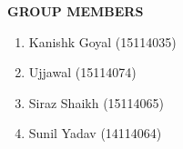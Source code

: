 \documentclass[18 pt]{article}
\begin{document}
\begin{large}
\begin{flushleft}


\begin{Large}
\textbf{GROUP MEMBERS}
\end{Large}
	\begin{enumerate}
\item Kanishk Goyal (15114035)
		
\item Ujjawal (15114074)
		
\item Siraz Shaikh (15114065)
		
\item Sunil Yadav (14114064)
	
		
	\end{enumerate}
	
\end{flushleft}
\end{large}
\end{document}
